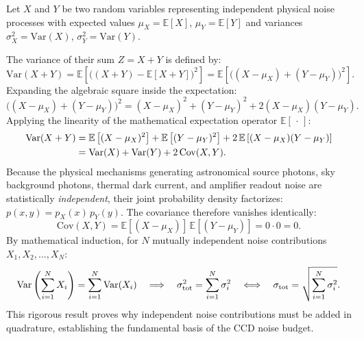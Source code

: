 \documentclass[11pt]{article}
\begin{document}
\begin{tcolorbox}[notebox, title=FIRST-PRINCIPLES DERIVATION: WHY VARIANCES ADD FOR INDEPENDENT NOISE SOURCES]
Let $X$ and $Y$ be two random variables representing independent physical noise processes with expected values $\mu_X = \mathbb{E}[X]$, $\mu_Y = \mathbb{E}[Y]$ and variances $\sigma_X^2 = \mathrm{Var}(X)$, $\sigma_Y^2 = \mathrm{Var}(Y)$.

The variance of their sum $Z = X + Y$ is defined by:
\begin{equation}
\mathrm{Var}(X + Y) = \mathbb{E}\left[\big((X + Y) - \mathbb{E}[X + Y]\big)^2\right] = \mathbb{E}\left[\big((X - \mu_X) + (Y - \mu_Y)\big)^2\right].
\end{equation}
Expanding the algebraic square inside the expectation:
\begin{equation}
\big((X - \mu_X) + (Y - \mu_Y)\big)^2 = (X - \mu_X)^2 + (Y - \mu_Y)^2 + 2(X - \mu_X)(Y - \mu_Y).
\end{equation}
Applying the linearity of the mathematical expectation operator $\mathbb{E}[\,\cdot\,]$:
\begin{align}
\mathrm{Var}(X + Y) &= \mathbb{E}\left[(X - \mu_X)^2\right] + \mathbb{E}\left[(Y - \mu_Y)^2\right] + 2\,\mathbb{E}\left[(X - \mu_X)(Y - \mu_Y)\right] \notag \\
&= \mathrm{Var}(X) + \mathrm{Var}(Y) + 2\,\mathrm{Cov}(X, Y).
\end{align}
Because the physical mechanisms generating astronomical source photons, sky background photons, thermal dark current, and amplifier readout noise are statistically \emph{independent}, their joint probability density factorizes: $p(x, y) = p_X(x)\,p_Y(y)$. The covariance therefore vanishes identically:
\begin{equation}
\mathrm{Cov}(X, Y) = \mathbb{E}[(X - \mu_X)]\,\mathbb{E}[(Y - \mu_Y)] = 0 \cdot 0 = 0.
\end{equation}
By mathematical induction, for $N$ mutually independent noise contributions $X_1, X_2, \dots, X_N$:
\begin{equation}
\mathrm{Var}\left(\sum_{i=1}^N X_i\right) = \sum_{i=1}^N \mathrm{Var}(X_i) \quad\Longrightarrow\quad \sigma_{\rm tot}^2 = \sum_{i=1}^N \sigma_i^2 \quad\Longleftrightarrow\quad \sigma_{\rm tot} = \sqrt{\sum_{i=1}^N \sigma_i^2}.
\end{equation}
This rigorous result proves why independent noise contributions must be added in quadrature, establishing the fundamental basis of the CCD noise budget.
\end{tcolorbox}
\end{document}
